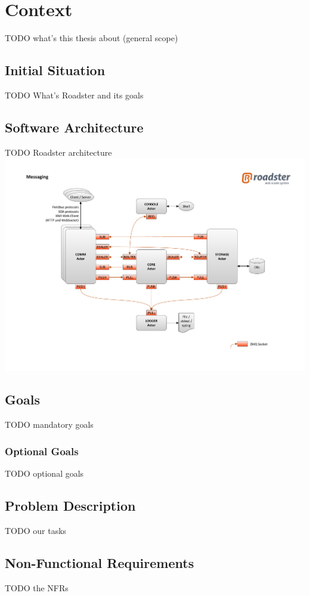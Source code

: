 \chapter{Context}
TODO what's this thesis about (general scope)

\section{Initial Situation}
TODO What's Roadster and its goals

\section{Software Architecture}
TODO Roadster architecture\\

\includegraphics[trim=4cm 2cm 3.5cm 2.8cm, clip=true, width=\textwidth]{img/roadster_arch.pdf}

\section{Goals}
TODO mandatory goals

\subsection*{Optional Goals}
TODO optional goals

\section{Problem Description}
TODO our tasks

\section{Non-Functional Requirements}
TODO the NFRs
